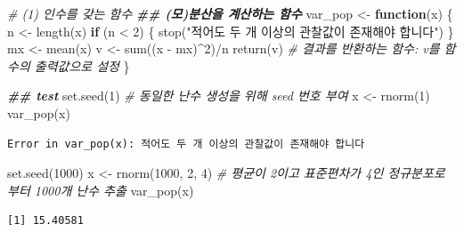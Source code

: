 \documentclass[
  11pt,
]{krantz}
\newenvironment{Shaded}{\begin{snugshade}}{\end{snugshade}}
\newcommand{\CommentTok}[1]{\textcolor[rgb]{0.37,0.37,0.37}{\textit{#1}}}
\newcommand{\ControlFlowTok}[1]{\textcolor[rgb]{0.27,0.27,0.27}{\textbf{#1}}}
\newcommand{\DecValTok}[1]{\textcolor[rgb]{0.06,0.06,0.06}{#1}}
\newcommand{\DocumentationTok}[1]{\textcolor[rgb]{0.37,0.37,0.37}{\textbf{\textit{#1}}}}
\newcommand{\FunctionTok}[1]{\textcolor[rgb]{0,0,0}{#1}}
\newcommand{\NormalTok}[1]{#1}
\newcommand{\OtherTok}[1]{\textcolor[rgb]{0.37,0.37,0.37}{#1}}
\newcommand{\SpecialCharTok}[1]{\textcolor[rgb]{0,0,0}{#1}}
\newcommand{\StringTok}[1]{\textcolor[rgb]{0.5,0.5,0.5}{#1}}
\begin{document}
\footnotesize

\begin{Shaded}
\begin{Highlighting}[]
\CommentTok{\# (1) 인수를 갖는 함수}
\DocumentationTok{\#\# (모)분산을 계산하는 함수}
\NormalTok{var\_pop }\OtherTok{\textless{}{-}} \ControlFlowTok{function}\NormalTok{(x) \{}
\NormalTok{  n }\OtherTok{\textless{}{-}} \FunctionTok{length}\NormalTok{(x)}
  \ControlFlowTok{if}\NormalTok{ (n }\SpecialCharTok{\textless{}} \DecValTok{2}\NormalTok{) \{}
    \FunctionTok{stop}\NormalTok{(}\StringTok{"적어도 두 개 이상의 관찰값이 존재해야 합니다"}\NormalTok{)}
\NormalTok{  \}}
\NormalTok{  mx }\OtherTok{\textless{}{-}} \FunctionTok{mean}\NormalTok{(x)}
\NormalTok{  v }\OtherTok{\textless{}{-}} \FunctionTok{sum}\NormalTok{((x }\SpecialCharTok{{-}}\NormalTok{ mx)}\SpecialCharTok{\^{}}\DecValTok{2}\NormalTok{)}\SpecialCharTok{/}\NormalTok{n}
  \FunctionTok{return}\NormalTok{(v) }\CommentTok{\# 결과를 반환하는 함수: v를 함수의 출력값으로 설정}
\NormalTok{\}}

\DocumentationTok{\#\# test}
\FunctionTok{set.seed}\NormalTok{(}\DecValTok{1}\NormalTok{) }\CommentTok{\# 동일한 난수 생성을 위해 seed 번호 부여}
\NormalTok{x }\OtherTok{\textless{}{-}} \FunctionTok{rnorm}\NormalTok{(}\DecValTok{1}\NormalTok{)}
\FunctionTok{var\_pop}\NormalTok{(x)}
\end{Highlighting}
\end{Shaded}

\begin{verbatim}
Error in var_pop(x): 적어도 두 개 이상의 관찰값이 존재해야 합니다
\end{verbatim}

\begin{Shaded}
\begin{Highlighting}[]
\FunctionTok{set.seed}\NormalTok{(}\DecValTok{1000}\NormalTok{)}
\NormalTok{x }\OtherTok{\textless{}{-}} \FunctionTok{rnorm}\NormalTok{(}\DecValTok{1000}\NormalTok{, }\DecValTok{2}\NormalTok{, }\DecValTok{4}\NormalTok{) }\CommentTok{\# 평균이 2이고 표준편차가 4인 정규분포로부터 1000개 난수 추출}
\FunctionTok{var\_pop}\NormalTok{(x)}
\end{Highlighting}
\end{Shaded}

\begin{verbatim}
[1] 15.40581
\end{verbatim}

\normalsize

\footnotesize
\end{document}
